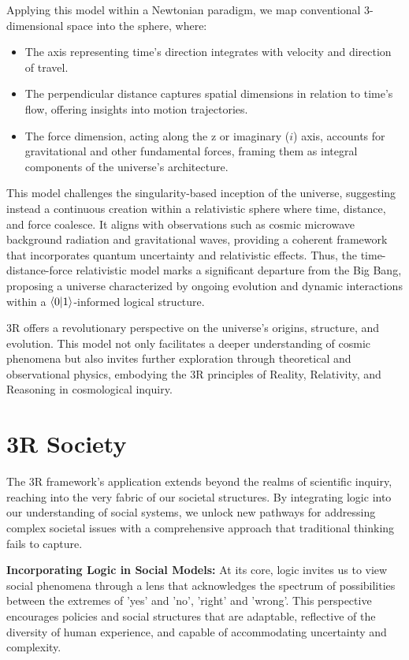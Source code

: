 \documentclass[12pt]{article}
\begin{document}
Applying this model within a Newtonian paradigm, we map conventional 3-dimensional space into the sphere, where:

\begin{itemize}
    \item The axis representing time's direction integrates with velocity and direction of travel.
    \item The perpendicular distance captures spatial dimensions in relation to time's flow, offering insights into motion trajectories.
    \item The force dimension, acting along the z or imaginary (\(i\)) axis, accounts for gravitational and other fundamental forces, framing them as integral components of the universe's architecture.
\end{itemize}

This model challenges the singularity-based inception of the universe, suggesting instead a continuous creation within a relativistic sphere where time, distance, and force coalesce. It aligns with observations such as cosmic microwave background radiation and gravitational waves, providing a coherent framework that incorporates quantum uncertainty and relativistic effects. Thus, the time-distance-force relativistic model marks a significant departure from the Big Bang, proposing a universe characterized by ongoing evolution and dynamic interactions within a \(\langle 0 | 1 \rangle\)-informed logical structure.

3R offers a revolutionary perspective on the universe's origins, structure, and evolution. This model not only facilitates a deeper understanding of cosmic phenomena but also invites further exploration through theoretical and observational physics, embodying the 3R principles of Reality, Relativity, and Reasoning in cosmological inquiry.

\section*{3R Society}

The 3R framework’s application extends beyond the realms of scientific inquiry, reaching into the very fabric of our societal structures. By integrating \qbit{} logic into our understanding of social systems, we unlock new pathways for addressing complex societal issues with a comprehensive approach that traditional thinking fails to capture.

\textbf{Incorporating \qbit{} Logic in Social Models:} At its core, \qbit{} logic invites us to view social phenomena through a lens that acknowledges the spectrum of possibilities between the extremes of 'yes' and 'no', 'right' and 'wrong'. This perspective encourages policies and social structures that are adaptable, reflective of the diversity of human experience, and capable of accommodating uncertainty and complexity.
\end{document}
